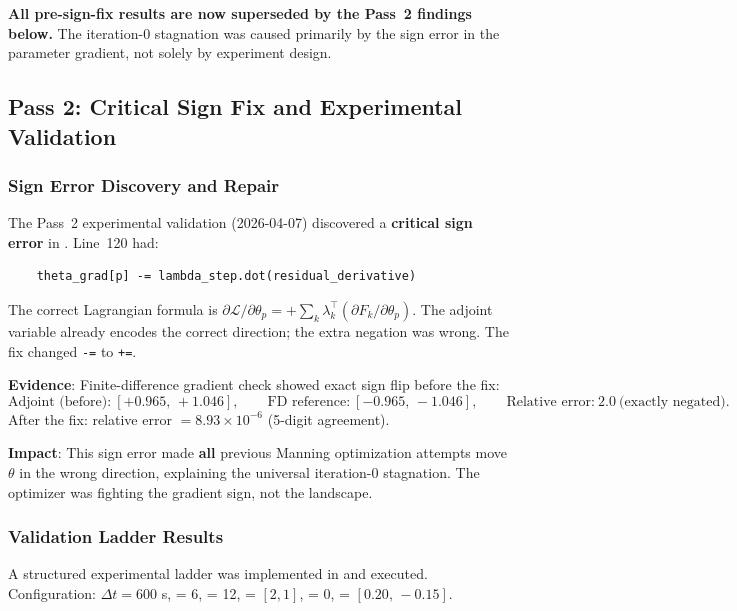 \documentclass[11pt]{article}
\begin{document}
\textbf{All pre-sign-fix results are now superseded by the Pass~2 findings below.} The iteration-0 stagnation was caused primarily by the sign error in the parameter gradient, not solely by experiment design.

\subsection{Pass 2: Critical Sign Fix and Experimental Validation}
\label{sec:sign-fix}

\subsubsection{Sign Error Discovery and Repair}
The Pass~2 experimental validation (2026-04-07) discovered a \textbf{critical sign error} in . Line~120 had:
\begin{verbatim}
    theta_grad[p] -= lambda_step.dot(residual_derivative)
\end{verbatim}
The correct Lagrangian formula is $\partial\mathcal{L}/\partial\theta_p = +\sum_k \lambda_k^\top (\partial F_k/\partial\theta_p)$. The adjoint variable already encodes the correct direction; the extra negation was wrong. The fix changed \texttt{-=} to \texttt{+=}.

\textbf{Evidence}: Finite-difference gradient check showed exact sign flip before the fix:
\[
\text{Adjoint (before):}\ [+0.965,\, +1.046],\qquad
\text{FD reference:}\ [-0.965,\, -1.046],\qquad
\text{Relative error:}\ 2.0\ \text{(exactly negated)}.
\]
After the fix: relative error $= 8.93\times 10^{-6}$ (5-digit agreement).

\textbf{Impact}: This sign error made \textbf{all} previous Manning optimization attempts move $\theta$ in the wrong direction, explaining the universal iteration-0 stagnation. The optimizer was fighting the gradient sign, not the landscape.

\subsubsection{Validation Ladder Results}
A structured experimental ladder was implemented in  and executed. Configuration: $\Delta t = 600$ s,  = 6,  = 12,  = $[2,1]$,  = 0,  = $[0.20,\, -0.15]$.
\end{document}

